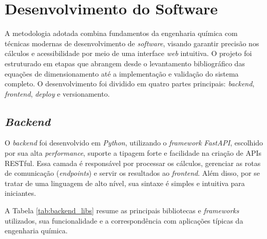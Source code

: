 \section{Desenvolvimento do Software}

A metodologia adotada combina fundamentos da engenharia química com técnicas modernas de desenvolvimento de \textit{software}, visando garantir precisão nos cálculos e acessibilidade por meio de uma interface \textit{web} intuitiva. O projeto foi estruturado em etapas que abrangem desde o levantamento bibliográfico das equações de dimensionamento até a implementação e validação do sistema completo. O desenvolvimento foi dividido em quatro partes principais: \textit{backend}, \textit{frontend}, \textit{deploy} e versionamento.

\subsection{\textit{Backend}}

O \textit{backend} foi desenvolvido em \textit{Python}, utilizando o \textit{framework} \textit{FastAPI}, escolhido por sua alta \textit{performance}, suporte a tipagem forte e facilidade na criação de APIs RESTful. Essa camada é responsável por processar os cálculos, gerenciar as rotas de comunicação (\textit{endpoints}) e servir os resultados ao \textit{frontend}. Além disso, por se tratar de uma linguagem de alto nível, sua sintaxe é simples e intuitiva para iniciantes.

A Tabela \ref{tab:backend_libs} resume as principais bibliotecas e \textit{frameworks} utilizados, sua funcionalidade e a correspondência com aplicações típicas da engenharia química.

